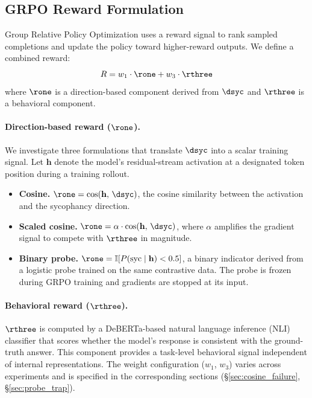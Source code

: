\subsection{GRPO Reward Formulation}
\label{ssec:reward}

Group Relative Policy Optimization \citep[GRPO;][]{shao2024grpo} uses a reward signal to rank sampled completions and update the policy toward higher-reward outputs.
We define a combined reward:
\begin{equation}
\label{eq:reward}
R = w_1 \cdot \rone + w_3 \cdot \rthree
\end{equation}
where $\rone$ is a direction-based component derived from $\dsyc$ and $\rthree$ is a behavioral component.

\paragraph{Direction-based reward ($\rone$).}
We investigate three formulations that translate $\dsyc$ into a scalar training signal.
Let $\mathbf{h}$ denote the model's residual-stream activation at a designated token position during a training rollout.

\begin{itemize}
\item[\textbf{F1}] \textbf{Cosine.} $\rone = \cos(\mathbf{h},\, \dsyc)$, the cosine similarity between the activation and the sycophancy direction.
\item[\textbf{F2}] \textbf{Scaled cosine.} $\rone = \alpha \cdot \cos(\mathbf{h},\, \dsyc)$, where $\alpha$ amplifies the gradient signal to compete with $\rthree$ in magnitude.
\item[\textbf{F3}] \textbf{Binary probe.} $\rone = \mathbb{I}[P(\text{syc} \mid \mathbf{h}) < 0.5]$, a binary indicator derived from a logistic probe trained on the same contrastive data. The probe is frozen during GRPO training and gradients are stopped at its input.
\end{itemize}

\paragraph{Behavioral reward ($\rthree$).}
$\rthree$ is computed by a DeBERTa-based natural language inference (NLI) classifier that scores whether the model's response is consistent with the ground-truth answer.
This component provides a task-level behavioral signal independent of internal representations.
The weight configuration ($w_1$, $w_3$) varies across experiments and is specified in the corresponding sections (\S\ref{sec:cosine_failure}, \S\ref{sec:probe_trap}).

